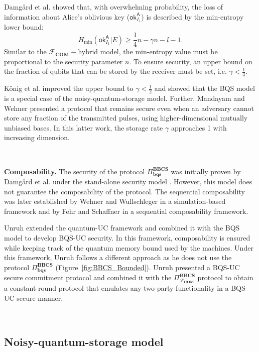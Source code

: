 Damg{\aa}rd et al. \cite{DFRSS07} showed that, with overwhelming probability, the loss of information about Alice's oblivious key ($\mathsf{ok}^{\mathsf{A}}_{I_{1}}$) is described by the min-entropy lower bound:
$$H_{\text{min}}(\mathsf{ok}^{\mathsf{A}}_{I_{1}} | E) \geq \frac{1}{4}n - \gamma n - l - 1.$$
Similar to the $\mathcal{F}_{\textbf{COM}}-$hybrid model, the min-entropy value must be proportional to the security parameter $n$. To ensure security, an upper bound on the fraction of qubits that can be stored by the receiver must be set, i.e. $\gamma < \frac{1}{4}$.

K\"onig et al. \cite{KWW12} improved the upper bound to $\gamma < \frac{1}{2}$ and showed that the BQS model is a special case of the noisy-quantum-storage model. Further, Mandayam and Wehner \cite{MW11} presented a protocol that remains secure even when an adversary cannot store any fraction of the transmitted pulses, using higher-dimensional mutually unbiased bases. In this latter work, the storage rate $\gamma$ approaches 1 with increasing dimension.

\

\noindent\textbf{Composability.} The security of the protocol $\Pi^{\textbf{BBCS}}_{\textbf{bqs}}$ was initially proven by Damg{\aa}rd et al. \cite{DFSS05, DFRSS07} under the stand-alone security model \cite{WW08}. However, this model does not guarantee the composability of the protocol. The sequential composability was later established by Wehner and Wullschleger \cite{WW08} in a simulation-based framework and by Fehr and Schaffner in a sequential composability framework.

Unruh \cite{U11} extended the quantum-UC framework and combined it with the BQS model to develop BQS-UC security. In this framework, composability is ensured while keeping track of the quantum memory bound used by the machines. Under this framework, Unruh follows a different approach as he does not use the protocol $\Pi^{\textbf{BBCS}}_{\textbf{bqs}}$ (Figure~\ref{fig:BBCS_Bounded}). Unruh presented a BQS-UC secure commitment protocol and combined it with the $\Pi^{\textbf{BBCS}}_{\mathcal{F}_{\textbf{COM}}}$ protocol to obtain a constant-round protocol that emulates any two-party functionality in a BQS-UC secure manner.

\

\subsection{Noisy-quantum-storage model}

